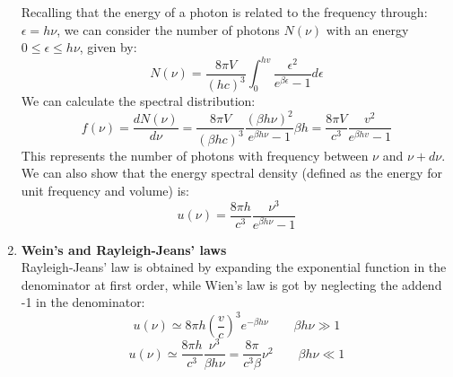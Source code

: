 \begin{enumerate}
    Recalling that the energy of a photon is related to the frequency through: $\epsilon = h\nu$, we can consider the number of photons $N(\nu)$ with an energy $0 \le \epsilon \le h\nu$, given by:
    $$ N(\nu) = \frac{8\pi V}{(hc)^3} \int_0^{hv} \frac{\epsilon^2}{e^{\beta \epsilon}-1}d\epsilon$$
    We can calculate the spectral distribution:
    $$f(\nu) = \frac{dN(\nu)}{d\nu} = \frac{8\pi V}{(\beta h c)^3}\frac{(\beta h \nu)^2}{e^{\beta h \nu}-1} \beta h = \frac{8\pi V}{c^3}\frac{v^2}{e^{\beta h v}-1}$$
    This represents the number of photons with frequency between $\nu$ and $\nu + d\nu$.
    We can also show that the energy spectral density (defined as the energy for unit frequency and volume) is:
    $$u(\nu) = \frac{8\pi h}{c^3} \frac{\nu^3}{e^{\beta h \nu}-1}$$
    \item \textbf{Wein's and Rayleigh-Jeans' laws}\\
    Rayleigh-Jeans' law is obtained by expanding the exponential function in the denominator at first order, while Wien's law is got by neglecting the addend -1 in the denominator:
    $$u(\nu) \simeq 8\pi h\left(\frac vc\right)^3 e^{-\beta h \nu} \qquad \beta h \nu \gg 1$$
    $$ u(\nu) \simeq \frac{8\pi h}{c^3} \frac{\nu^3}{\beta h \nu} = \frac{8\pi}{c^3\beta} \nu^2 \qquad \beta h \nu \ll 1$$
\end{enumerate}